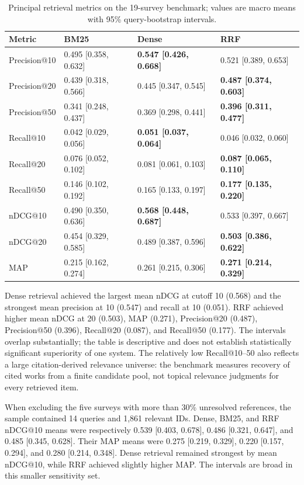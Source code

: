 \documentclass[sigconf,review,anonymous]{acmart}
\begin{document}
\begin{table}[t]
\centering
\small
\setlength{\tabcolsep}{3pt}
\begin{tabularx}{\textwidth}{>{\raggedright\arraybackslash}XYYY}
\toprule
Metric & BM25 & Dense & RRF \\
\midrule
Precision@10 & 0.495 [0.358, 0.632] & \textbf{0.547 [0.426, 0.668]} & 0.521 [0.389, 0.653] \\
Precision@20 & 0.439 [0.318, 0.566] & 0.445 [0.347, 0.545] & \textbf{0.487 [0.374, 0.603]} \\
Precision@50 & 0.341 [0.248, 0.437] & 0.369 [0.298, 0.441] & \textbf{0.396 [0.311, 0.477]} \\
Recall@10 & 0.042 [0.029, 0.056] & \textbf{0.051 [0.037, 0.064]} & 0.046 [0.032, 0.060] \\
Recall@20 & 0.076 [0.052, 0.102] & 0.081 [0.061, 0.103] & \textbf{0.087 [0.065, 0.110]} \\
Recall@50 & 0.146 [0.102, 0.192] & 0.165 [0.133, 0.197] & \textbf{0.177 [0.135, 0.220]} \\
nDCG@10 & 0.490 [0.350, 0.636] & \textbf{0.568 [0.448, 0.687]} & 0.533 [0.397, 0.667] \\
nDCG@20 & 0.454 [0.329, 0.585] & 0.489 [0.387, 0.596] & \textbf{0.503 [0.386, 0.622]} \\
MAP & 0.215 [0.162, 0.274] & 0.261 [0.215, 0.306] & \textbf{0.271 [0.214, 0.329]} \\
\bottomrule
\end{tabularx}
\caption{Principal retrieval metrics on the 19-survey benchmark; values are macro means with 95\% query-bootstrap intervals.}
\end{table}

Dense retrieval achieved the largest mean nDCG at cutoff 10 (0.568) and the strongest mean precision at 10 (0.547) and recall at 10 (0.051). RRF achieved higher mean nDCG at 20 (0.503), MAP (0.271), Precision@20 (0.487), Precision@50 (0.396), Recall@20 (0.087), and Recall@50 (0.177). The intervals overlap substantially; the table is descriptive and does not establish statistically significant superiority of one system. The relatively low Recall@10–50 also reflects a large citation-derived relevance universe: the benchmark measures recovery of cited works from a finite candidate pool, not topical relevance judgments for every retrieved item.

When excluding the five surveys with more than 30\% unresolved references, the sample contained 14 queries and 1,861 relevant IDs. Dense, BM25, and RRF nDCG@10 means were respectively 0.539 [0.403, 0.678], 0.486 [0.321, 0.647], and 0.485 [0.345, 0.628]. Their MAP means were 0.275 [0.219, 0.329], 0.220 [0.157, 0.294], and 0.280 [0.214, 0.348]. Dense retrieval remained strongest by mean nDCG@10, while RRF achieved slightly higher MAP. The intervals are broad in this smaller sensitivity set.
\end{document}
